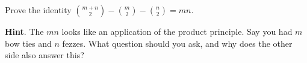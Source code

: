 \documentclass{book}
\begin{document}
\setcounter{cpjt}{95}
\addtocounter{cpjt}{-1}
\begin{activity}\label{act-bowtiefez}
\hypertarget{p-681}{}%
Prove the identity \(\binom{m + n}{2} - \binom{m}{2} - \binom{n}{2} = mn\).%
\par\smallskip%
\noindent\textbf{Hint}.\hypertarget{hint-49}{}\quad%
\hypertarget{p-682}{}%
The \(mn\) looks like an application of the product principle.  Say you had \(m\) bow ties and \(n\) fezzes.  What question should you ask, and why does the other side also answer this?%
\par\smallskip%
\noindent\end{activity}

\clearpage
\end{document}

